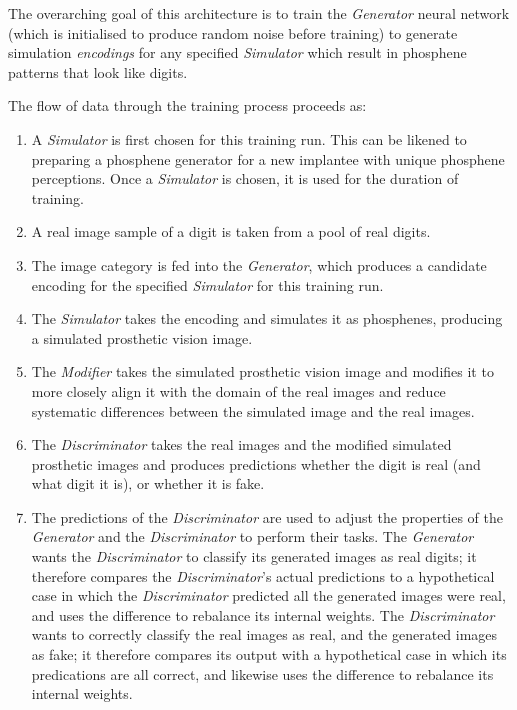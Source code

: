 \documentclass[a4paper,11pt,openany]{book}
\begin{document}
The overarching goal of this architecture is to train the \emph{Generator} neural network (which is initialised to produce random noise before training) to generate simulation \emph{encodings} for any specified \emph{Simulator} which result in phosphene patterns that look like digits.

The flow of data through the training process proceeds as:
\begin{enumerate}
\item A \emph{Simulator} is first chosen for this training run.
This can be likened to preparing a phosphene generator for a new implantee with unique phosphene perceptions.
Once a \emph{Simulator} is chosen, it is used for the duration of training.
\item A real image sample of a digit is taken from a pool of real digits.
\item The image category is fed into the \emph{Generator}, which produces a candidate encoding for the specified \emph{Simulator} for this training run.
\item The \emph{Simulator} takes the encoding and simulates it as phosphenes, producing a simulated prosthetic vision image.
\item The \emph{Modifier} takes the simulated prosthetic vision image and modifies it to more closely align it with the domain of the real images and reduce systematic differences between the simulated image and the real images.
\item The \emph{Discriminator} takes the real images and the modified simulated prosthetic images and produces predictions whether the digit is real (and what digit it is), or whether it is fake.
\item The predictions of the \emph{Discriminator} are used to adjust the properties of the \emph{Generator} and the \emph{Discriminator} to perform their tasks.
The \emph{Generator} wants the \emph{Discriminator} to classify its generated images as real digits; it therefore compares the \emph{Discriminator}'s actual predictions to a hypothetical case in which the \emph{Discriminator} predicted all the generated images were real, and uses the difference to rebalance its internal weights.
The \emph{Discriminator} wants to correctly classify the real images as real, and the generated images as fake; it therefore compares its output with a hypothetical case in which its predications are all correct, and likewise uses the difference to rebalance its internal weights.
\end{enumerate}
\end{document}

